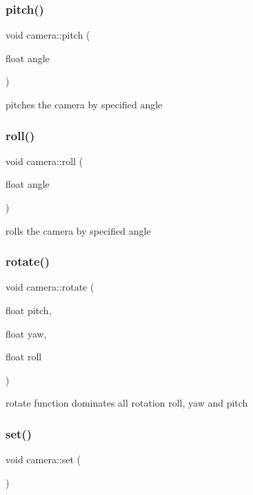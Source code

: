 \subsubsection{\texorpdfstring{pitch()}{pitch()}}
{\footnotesize\ttfamily void camera\+::pitch (\begin{DoxyParamCaption}\item[{float}]{angle }\end{DoxyParamCaption})}

pitches the camera by specified angle \hypertarget{classcamera_a3da4be99d5e2d1e3b1463a641e5ecc5a}{}\label{classcamera_a3da4be99d5e2d1e3b1463a641e5ecc5a} 
\subsubsection{\texorpdfstring{roll()}{roll()}}
{\footnotesize\ttfamily void camera\+::roll (\begin{DoxyParamCaption}\item[{float}]{angle }\end{DoxyParamCaption})}

rolls the camera by specified angle \hypertarget{classcamera_ab44bba4ebddf9079239507acad2802db}{}\label{classcamera_ab44bba4ebddf9079239507acad2802db} 
\subsubsection{\texorpdfstring{rotate()}{rotate()}}
{\footnotesize\ttfamily void camera\+::rotate (\begin{DoxyParamCaption}\item[{float}]{pitch,  }\item[{float}]{yaw,  }\item[{float}]{roll }\end{DoxyParamCaption})}

rotate function dominates all rotation roll, yaw and pitch \hypertarget{classcamera_a7ebf7f711ade618ac641b2ab29f619e1}{}\label{classcamera_a7ebf7f711ade618ac641b2ab29f619e1} 
\subsubsection{\texorpdfstring{set()}{set()}\hspace{0.1cm}{\footnotesize\ttfamily [1/2]}}
{\footnotesize\ttfamily void camera\+::set (\begin{DoxyParamCaption}{ }\end{DoxyParamCaption})}

